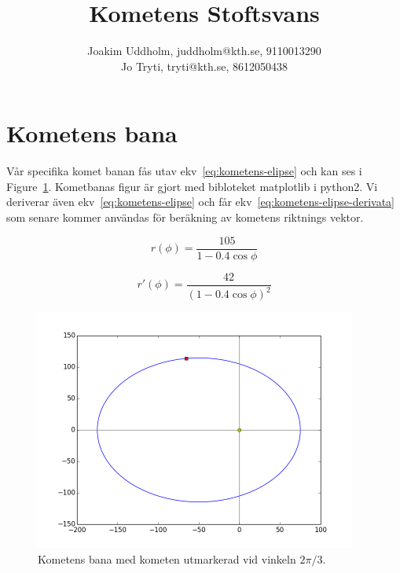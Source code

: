 \documentclass[11pt,twoside]{article}
\title{Kometens Stoftsvans}
\author{Joakim Uddholm, juddholm@kth.se, 9110013290 \\
		Jo Tryti, tryti@kth.se, 8612050438}
\date{}
\begin{document}
\maketitle
\newpage


\section{Kometens bana}


Vår specifika komet banan fås utav ekv~\eqref{eq:kometens-elipse} och kan ses i Figure~\ref{fig:kometens-elipse}. Kometbanas figur är gjort med bibloteket matplotlib i python2. 
Vi deriverar även ekv~\eqref{eq:kometens-elipse} och får ekv~\eqref{eq:kometens-elipse-derivata} som senare kommer användas för beräkning av kometens riktnings vektor.

\begin{equation} \label{eq:kometens-elipse}
     r(\phi)=\frac{105}{1-0.4\cos\phi}
\end{equation}

\begin{equation} \label{eq:kometens-elipse-derivata}
    r'(\phi)=\frac{42}{(1-0.4\cos\phi)^2}
\end{equation}


\begin{figure}[h!] 
	\label{fig:kometens-elipse}
	\includegraphics[width=300pt]{imgs/elipse.png}
  	\caption{Kometens bana med kometen utmarkerad vid vinkeln $2\pi/3$.}
\end{figure}
\end{document}
